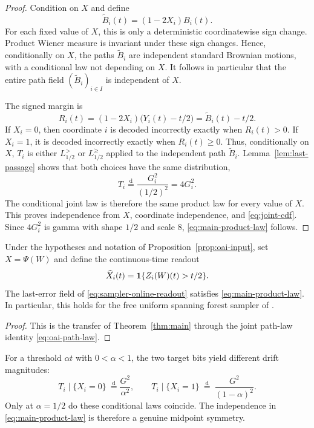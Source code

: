 \begin{proof}
Condition on $X$ and define
\begin{equation}\label{eq:signed-brownian}
  \widetilde B_i(t)=(1-2X_i)B_i(t).
\end{equation}
For each fixed value of $X$, this is only a deterministic coordinatewise sign
change.  Product Wiener measure is invariant under these sign changes.  Hence,
conditionally on $X$, the paths $\widetilde B_i$ are independent standard
Brownian motions, with a conditional law not depending on $X$.  It follows in
particular that the entire path field $(\widetilde B_i)_{i\in I}$ is
independent of $X$.

The signed margin is
\begin{equation}\label{eq:signed-margin}
  R_i(t)=(1-2X_i)\bigl(Y_i(t)-t/2\bigr)
        =\widetilde B_i(t)-t/2.
\end{equation}
If $X_i=0$, then coordinate $i$ is decoded incorrectly exactly when
$R_i(t)>0$.  If $X_i=1$, it is decoded incorrectly exactly when
$R_i(t)\ge0$.  Thus, conditionally on $X$, $T_i$ is either
$L_{1/2}^{>}$ or $L_{1/2}^{\ge}$ applied to the independent path
$\widetilde B_i$.  Lemma~\ref{lem:last-passage} shows that both choices have
the same distribution,
\[
  T_i\stackrel{\mathrm d}{=}\frac{G_i^2}{(1/2)^2}=4G_i^2.
\]
The conditional joint law is therefore the same product law for every value of
$X$.  This proves independence from $X$, coordinate independence, and
\eqref{eq:joint-cdf}.  Since $4G_i^2$ is gamma with shape $1/2$ and scale
$8$, \eqref{eq:main-product-law} follows.
\end{proof}

\begin{corollary}\label{cor:oai-sampler}
Under the hypotheses and notation of Proposition~\ref{prop:oai-input}, set
$X=\Psi(W)$ and define the continuous-time readout
\begin{equation}\label{eq:sampler-online-readout}
  \widehat X_i(t)=\mathbf{1}\{Z_i(W)(t)>t/2\}.
\end{equation}
The last-error field of \eqref{eq:sampler-online-readout} satisfies
\eqref{eq:main-product-law}.  In particular, this holds for the free uniform
spanning forest sampler of \cite{OpenAI2026FUSF}.
\end{corollary}

\begin{proof}
This is the transfer of Theorem~\ref{thm:main} through the joint path-law
identity \eqref{eq:oai-path-law}.
\end{proof}

\begin{remark}\label{rem:midpoint}
For a threshold $\alpha t$ with $0<\alpha<1$, the two target bits yield
different drift magnitudes:
\begin{equation}\label{eq:off-midpoint}
  T_i\mid\{X_i=0\}\ \stackrel{\mathrm d}{=}\frac{G^2}{\alpha^2},
  \qquad
  T_i\mid\{X_i=1\}\ \stackrel{\mathrm d}{=}\
  \frac{G^2}{(1-\alpha)^2}.
\end{equation}
Only at $\alpha=1/2$ do these conditional laws coincide.  The independence in
\eqref{eq:main-product-law} is therefore a genuine midpoint symmetry.
\end{remark}
